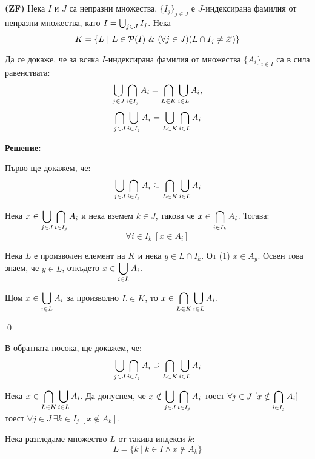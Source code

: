 \begin{problem}
\textbf{(ZF)}
Нека $I$ и $J$ са непразни множества, $\{I_j\}_{j \in J}$ е $J$-индексирана фамилия от непразни множества,
като $I = \bigcup_{j \in J} I_j$. Нека
\[
K = \{L\ |\ L \in \pow(I) \land (\forall j \in J) (L \cap I_j \neq \varnothing)\}
\]

Да се докаже, че за всяка $I$-индексирана фамилия от множества $\{A_i\}_{i \in I}$ са в сила равенствата:
\[
\bigcup_{j \in J} \bigcap_{i \in I_j} A_i = \bigcap_{L \in K} \bigcup_{i \in L} A_i,
\]
\[
\bigcap_{j \in J} \bigcup_{i \in I_j} A_i = \bigcup_{L \in K} \bigcap_{i \in L} A_i
\]

\textbf{Решение:}
\smallbreak

\quad
Първо ще докажем, че:
\[
\bigcup_{j \in J} \bigcap_{i \in I_j} A_i \subseteq \bigcap_{L \in K} \bigcup_{i \in L} A_i
\]

\begin{tcolorbox}[mybox={Доказателство:}]
\quad
Нека \(\displaystyle x \in \bigcup_{j \in J} \bigcap_{i \in I_j} A_i\) и нека
вземем $k \in J$, такова че $\displaystyle x \in \bigcap_{i \in I_k} A_i$. Тогава:
\begin{equation}
\forall i \in I_k\ [x \in A_i]
\end{equation}

\quad
Нека $L$ е произволен елемент на $K$ и нека $y \in L \cap I_k$.
От (1) $x \in A_y$.
Освен това знаем, че $\displaystyle y \in L$, откъдето $\displaystyle x \in \bigcup_{i \in L} A_i$.

\quad
Щом $\displaystyle x \in \bigcup_{i \in L} A_i$ за произволно $L \in K$,
то $\displaystyle x \in \bigcap_{L \in K} \bigcup_{i \in L} A_i$.

\qed
\end{tcolorbox}

\bigbreak
\quad
В обратната посока, ще докажем, че:
\[
\bigcup_{j \in J} \bigcap_{i \in I_j} A_i \supseteq \bigcap_{L \in K} \bigcup_{i \in L} A_i
\]
\begin{tcolorbox}[mybox={Доказателство:}]
\quad
Нека \(\displaystyle x \in \bigcap_{L \in K} \bigcup_{i \in L} A_i\).
Да допуснем, че
$\displaystyle x \notin \bigcup_{j \in J} \bigcap_{i \in I_j} A_i$
тоест
$\displaystyle \forall j \in J\ [x \notin \bigcap_{i \in I_j} A_i]$
тоест
$\displaystyle \forall j \in J\ \exists k \in I_j \ [x \notin A_k]$.

\quad
Нека разгледаме множество $L$ от такива индекси $k$:
\[
L = \{k \ |\ k \in I \land x \notin A_k\}
\]


\end{tcolorbox}
\end{problem}
